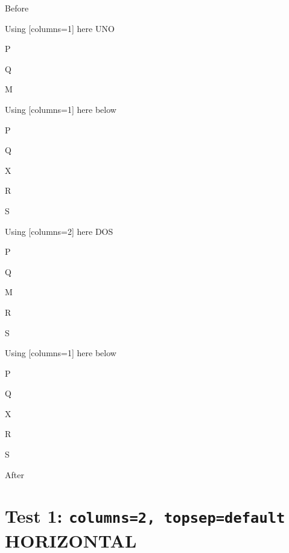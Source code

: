 \documentclass[12pt]{article}
\begin{document}
Before
\begin{enumext}[columns=2,nosep]%

\item Using [columns=1] here UNO

  \begin{enumext}[columns=1,nosep]%
     \item  P \item Q \item M %
  \end{enumext}

\item Using [columns=1] here below
\begin{enumext}[columns=1]%
     \item  P \item Q \item X  \item R \item S
  \end{enumext}

\columnbreak

\item Using [columns=2] here DOS

  \begin{enumext}[columns=2,nosep]%
    \item  P \item Q \item M \item R \item S
  \end{enumext}

\item Using [columns=1] here below
\begin{enumext}[columns=1]%
     \item  P \item Q \item X  \item R \item S
  \end{enumext}

\end{enumext}
After

\newpage

\section{Test 1: \texttt{columns=2, topsep=default} HORIZONTAL}
\end{document}
